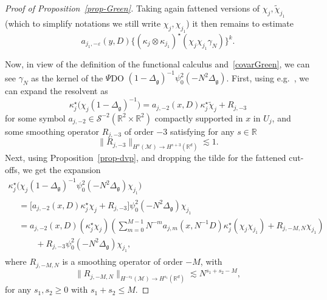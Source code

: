 \documentclass[10pt]{amsart}
\theoremstyle{definition}\newtheorem{defi}[theo]{Definition}\newtheorem{rema}[theo]{Remark}\newtheorem{exam}[theo]{Example}\newtheorem{exem}[theo]{Example}\newtheorem{nota}[theo]{Notation}
\newcommand{\R}{\mathbb{R}}
\renewcommand{\S}{\mathcal{S}}
\newcommand{\M}{\mathcal{M}}
\newcommand{\g}{\mathfrak{g}}
\newcommand{\Dlg}{\Delta_{\g}}
\newcommand{\eps}{\varepsilon}
\newcommand{\kk}{\kappa}
\newcommand{\wt}{\widetilde}
\newcommand{\les}{\lesssim}
\begin{document}
\begin{proof}[Proof of Proposition~\ref{prop-Green}]
Taking again fattened versions of $\chi_{j},\widetilde{\chi}_{j_{1}}$ (which to simplify notations we still write $\chi_{j},\chi_{j_{1}}$) it then remains to estimate
\begin{equation*}
a_{j_1,-\eps}(y,D)\big\{\left(\kk_{j}\otimes\kk_{j_1}\right)^{\star}\left(\chi_{j}\chi_{j_1}\gamma_N\right)\big\}^k.
\end{equation*}

Now, in view of the definition of the functional calculus and~\eqref{covarGreen}, we can see $\gamma_N$ as the kernel of the $\Psi$DO $(1-\Dlg)^{-1}\psi_0^2(-N^2\Dlg)$. First, using e.g.~\cite[Theorem~18.1.24]{HormanderIII}, we can expand the resolvent as
\begin{equation*}
\kk_j^{\star}\big(\chi_j(1-\Dlg)^{-1}\big) = a_{j,-2}(x,D)\kk_j^{\star}\wt\chi_j + R_{j,-3}
\end{equation*}
for some symbol $a_{j,-2}\in \S^{-2}(\R^2\times\R^2)$ compactly supported in $x$ in $U_j$, and some smoothing operator $R_{j,-3}$ of order $-3$ satisfying for any $s\in\R$
\begin{equation*}
\big\|R_{j,-3}\big\|_{H^{s}(\M)\to H^{s+3}(\R^d)}\les 1.
\end{equation*}
Next, using Proposition~\ref{prop-dvp}, and dropping the tilde for the fattened cut-offs, we get the expansion
\begin{multline*}
\kk_{j}^{\star}\big(\chi_{j}(1-\Dlg)^{-1}\psi_0^2\left(-N^2\Dlg\right)\chi_{j_1}\big)\\
\begin{aligned}
&=\Big[a_{j,-2}(x,D)\kk_{j}^{\star}\chi_{j} + R_{j,-3}\Big]\psi_0^2\left(-N^2\Dlg\right)\chi_{j_1}
\\&=a_{j,-2}(x,D)\left(\kk_j^\star\chi_{j}\right)\left(\sum_{m=0}^{M-1}N^{-m}a_{j,m}\left(x,N^{-1}D\right)\kk_j^{\star}\left(\chi_j\chi_{j_1}\right)+R_{j,-M,N}\chi_{j_1}\right)\\
&\qquad + R_{j,-3}\psi_0^2\left(-N^2\Dlg\right)\chi_{j_1},
\end{aligned}
\end{multline*}
where $R_{j,-M,N}$ is a smoothing operator of order $-M$, with
\begin{equation*}
\big\|R_{j,-M,N}\big\|_{H^{-s_2}(\M)\to H^{s_1}(\R^d)} \les N^{s_1+s_2-M},
\end{equation*}
for any $s_1,s_2\ge 0$ with $s_1+s_2\le M$.


\end{proof}
\end{document}
